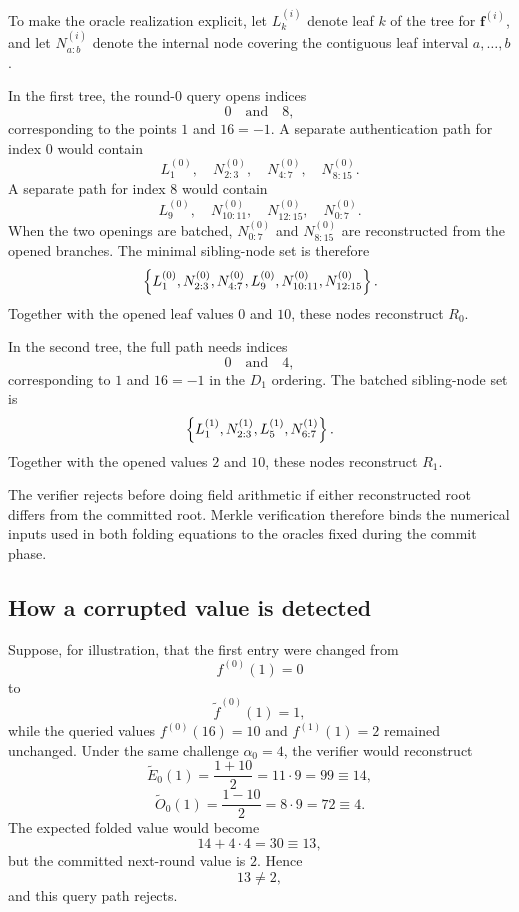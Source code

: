 To make the oracle realization explicit, let $L_k^{(i)}$ denote leaf $k$ of the tree for
$\mathbf f^{(i)}$, and let $N_{a:b}^{(i)}$ denote the internal node covering the contiguous
leaf interval $a,\ldots,b$.

In the first tree, the round-$0$ query opens indices
\[
    0\quad\text{and}\quad8,
\]
corresponding to the points $1$ and $16=-1$. A separate authentication path for index $0$
would contain
\[
    L_1^{(0)},\quad
    N_{2:3}^{(0)},\quad
    N_{4:7}^{(0)},\quad
    N_{8:15}^{(0)}.
\]
A separate path for index $8$ would contain
\[
    L_9^{(0)},\quad
    N_{10:11}^{(0)},\quad
    N_{12:15}^{(0)},\quad
    N_{0:7}^{(0)}.
\]
When the two openings are batched, $N_{0:7}^{(0)}$ and $N_{8:15}^{(0)}$ are reconstructed
from the opened branches. The minimal sibling-node set is therefore
\[
\left\{
L_1^{(0)},
N_{2:3}^{(0)},
N_{4:7}^{(0)},
L_9^{(0)},
N_{10:11}^{(0)},
N_{12:15}^{(0)}
\right\}.
\]
Together with the opened leaf values $0$ and $10$, these nodes reconstruct $R_0$.

In the second tree, the full path needs indices
\[
    0\quad\text{and}\quad4,
\]
corresponding to $1$ and $16=-1$ in the $D_1$ ordering. The batched sibling-node set is
\[
\left\{
L_1^{(1)},
N_{2:3}^{(1)},
L_5^{(1)},
N_{6:7}^{(1)}
\right\}.
\]
Together with the opened values $2$ and $10$, these nodes reconstruct $R_1$.

The verifier rejects before doing field arithmetic if either reconstructed root differs from
the committed root. Merkle verification therefore binds the numerical inputs used in both
folding equations to the oracles fixed during the commit phase.

\subsection{How a corrupted value is detected}

Suppose, for illustration, that the first entry were changed from
\[
    f^{(0)}(1)=0
\]
to
\[
    \widetilde f^{(0)}(1)=1,
\]
while the queried values $f^{(0)}(16)=10$ and $f^{(1)}(1)=2$ remained unchanged. Under the
same challenge $\alpha_0=4$, the verifier would reconstruct
\[
    \widetilde E_0(1)
    =\frac{1+10}{2}
    =11\cdot9
    =99
    \equiv14,
\]
\[
    \widetilde O_0(1)
    =\frac{1-10}{2}
    =8\cdot9
    =72
    \equiv4.
\]
The expected folded value would become
\[
    14+4\cdot4=30\equiv13,
\]
but the committed next-round value is $2$. Hence
\[
    13\neq2,
\]
and this query path rejects.

